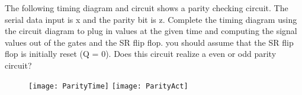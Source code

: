 \begin{description}
        The following timing diagram and circuit shows a parity checking circuit.  The serial
        data input is x and the parity bit is z.  Complete the timing diagram using the circuit
        diagram to plug in values at the given time and computing the signal values out of
        the gates and the SR flip flop.  you should assume that the SR flip flop is initially
        reset (Q = 0).  Does this circuit realize a even or odd parity circuit?

        \begin{figure}[ht]
            \texttt{[image: ParityTime]}
            \vspace{0.4cm}
            \texttt{[image: ParityAct]}
        \end{figure}

\end{description}
